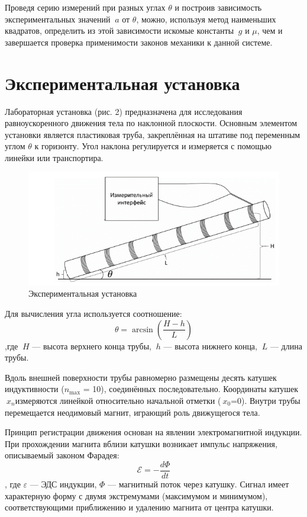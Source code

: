 \documentclass[a4paper, 12pt]{article}
\begin{document}
Проведя серию измерений при разных углах \(\theta\) и построив зависимость экспериментальных значений \(\ a\) от \(\theta\), можно, используя метод наименьших квадратов, определить из этой зависимости искомые константы \(\ g\) и \(\mu\), чем и завершается проверка применимости законов механики к данной системе.

\section{Экспериментальная установка }
Лабораторная установка (рис. 2) предназначена для исследования равноускоренного движения тела по наклонной плоскости. Основным элементом установки является пластиковая труба, закреплённая на штативе под переменным углом \(\theta\) к горизонту. Угол наклона регулируется и измеряется с помощью линейки или транспортира.\\

\begin{figure}[h]
\centering
\includegraphics[width=0.8\linewidth]{ЭКСП УСТ.png}
\caption{Экспериментальная установка  }
\label{fig:voltage_current}
\end{figure}






Для вычисления угла используется соотношение:\[
\theta = \arcsin\left(\frac{H - h}{L}\right)
\],где 
\(\ H\) — высота верхнего конца трубы, 
\(\ h\) — высота нижнего конца, 
\(\ L\) — длина трубы.

Вдоль внешней поверхности трубы равномерно размещены десять катушек индуктивности ($n_{\text{max}}$ = 10), соединённых последовательно. Координаты катушек \(\ x_n\)измеряются линейкой относительно начальной отметки (\(\ x_0\)=0). Внутри трубы перемещается неодимовый магнит, играющий роль движущегося тела.

Принцип регистрации движения основан на явлении электромагнитной индукции. При прохождении магнита вблизи катушки возникает импульс напряжения, описываемый законом Фарадея:\[
\mathcal{E} = -\frac{d\Phi}{dt}
\],
где 
\(\varepsilon\) — ЭДС индукции, \(\Phi\) — магнитный поток через катушку. Сигнал имеет характерную форму с двумя экстремумами (максимумом и минимумом), соответствующими приближению и удалению магнита от центра катушки.
\end{document}
